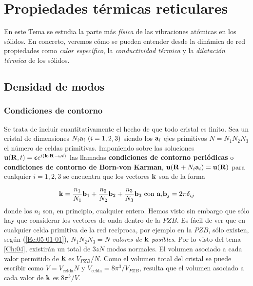 \chapter{Propiedades térmicas reticulares} \label{Ch:05}

En este Tema se estudia la parte más \textit{física} de las vibraciones atómicas en los sólidos. En concreto, veremos cómo se pueden entender desde la dinámica de red propiedades como \textit{calor específico}, la \textit{conductividad térmica} y la \textit{dilatación térmica} de los sólidos.

\section{Densidad de modos}

\subsection{Condiciones de contorno}

Se trata de incluir cuantitativamente el hecho de que todo cristal es finito. Sea un cristal de dimensiones $N_i \mathbf{a}_i  \ (i=1,2,3)$ siendo los $\mathbf{a}_i$ ejes primitivos $N=N_1N_2N_3$ el número de celdas primitivas. Imponiendo sobre las soluciones $\mathbf{u}(\mathbf{R},t)= \boldsymbol{\epsilon} e^{i(\mathbf{k} \cdot \mathbf{R} - \omega t)}$ las llamadas \textbf{condiciones de contorno periódicas} o \textbf{condiciones de contorno de Born-von Karman}, $\mathbf{u}(\mathbf{R} + N_i \mathbf{a}_i) = \mathbf{u} (\mathbf{R})$ para cualquier $i=1,2,3$ se encuentra que los vectores $\mathbf{k}$ son de la forma

\begin{equation}
	\mathbf{k} = \frac{n_1}{N_1} \mathbf{b}_1 + \frac{n_2}{N_2} \mathbf{b}_2 + \frac{n_3}{N_3} \mathbf{b}_3 \ \text{con} \ \mathbf{a}_i \mathbf{b}_j = 2 \pi \delta_{ij} \label{Ec:05-01-01}
\end{equation}
donde los $n_i$ son, en principio, cualquier entero. Hemos visto sin embargo que sólo hay que considerar los vectores de onda dentro de la $PZB$. Es fácil de ver que en cualquier celda primitiva de la red recíproca, por ejemplo en la $PZB$, sólo existen, según (\ref{Ec:05-01-01}), $N_1N_2N_3=N$ \textit{valores de $\mathbf{k}$ posibles}. Por lo visto del tema \ref{Ch:04}, existirán un total de $3zN$ modos normales. El volumen asociado a cada valor permitido de $\mathbf{k}$ es $V_{PZB}/N$. Como el volumen total del cristal se puede escribir como $V=V_{\text{celda}} N$ y $V_{\text{celda}} = 8 \pi^3 /V_{PZB}$, resulta que el volumen asociado a cada valor de $\mathbf{k}$ es $8 \pi^3/ V$.

